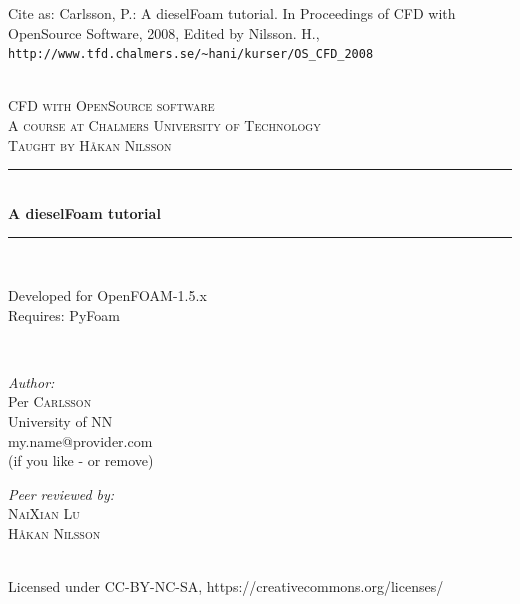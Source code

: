 \documentclass{report}
\newcommand{\HRule}{\rule{\linewidth}{0.5mm}}
\begin{document}
\begin{titlepage}
  \begin{center}
 

    {\small Cite as: Carlsson, P.: A dieselFoam tutorial. In Proceedings of CFD with OpenSource Software, 2008, Edited by Nilsson. H., \verb+http://www.tfd.chalmers.se/~hani/kurser/OS_CFD_2008+}
	
	~\\[0.4cm]
	\textsc{\LARGE CFD with OpenSource software}\\[0.5cm]	
	\textsc{A course at Chalmers University of Technology}\\
	\textsc{Taught by H{\aa}kan Nilsson}\\[0.5cm]	
	
	\HRule \\[0.4cm]
	{ \huge \bfseries A dieselFoam tutorial}\\[0.4cm]
	\HRule \\[1cm]
	
        \begin{minipage}{0.35\textwidth}
        Developed for OpenFOAM-1.5.x\\
        Requires: PyFoam
	\end{minipage}\\[1cm]

	\begin{minipage}{0.4\textwidth}
	\begin{flushleft} \large
	\emph{Author:}\\
	Per \textsc{Carlsson}\\
        University of NN\\
        my.name@provider.com\\
        (if you like - or remove)
	\end{flushleft}
	\end{minipage}
	\begin{minipage}{0.4\textwidth}
	\begin{flushright} \large
	\emph{Peer reviewed by:} \\
	 \textsc{NaiXian Lu}\\
	\textsc{H\aa kan Nilsson}\\
	\end{flushright}
	\end{minipage}

        ~\\[1cm]

        Licensed under CC-BY-NC-SA, https://creativecommons.org/licenses/


\end{center}
\end{titlepage}
\end{document}

